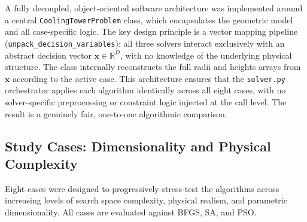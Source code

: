 A fully decoupled, object-oriented software architecture was implemented around a central \texttt{CoolingTowerProblem} class, which encapsulates the geometric model and all case-specific logic. 
The key design principle is a vector mapping pipeline (\texttt{unpack\_decision\_variables}): all three solvers interact exclusively with an abstract decision vector $\mathbf{x} \in \mathbb{R}^D$, with no knowledge of the underlying physical structure. 
The class internally reconstructs the full radii and heights arrays from $\mathbf{x}$ according to the active case. 
This architecture ensures that the \texttt{solver.py} orchestrator applies each algorithm identically across all eight cases, with no solver-specific preprocessing or constraint logic injected at the call level. 
The result is a genuinely fair, one-to-one algorithmic comparison.

\subsection{Study Cases: Dimensionality and Physical Complexity}

Eight cases were designed to progressively stress-test the algorithms across increasing levels of search space complexity, physical realism, and parametric dimensionality. 
All cases are evaluated against BFGS, SA, and PSO.

